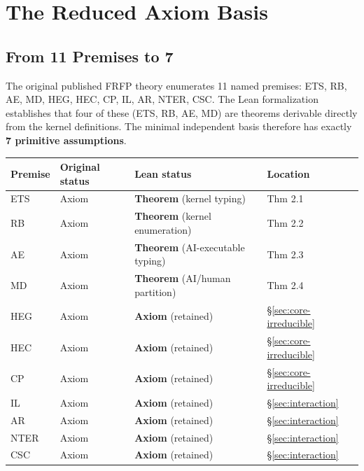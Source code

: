 \section{The Reduced Axiom Basis}
\label{ch:basis}

\subsection{From 11 Premises to 7}

The original published FRFP theory enumerates 11 named premises: ETS, RB, AE, MD,
HEG, HEC, CP, IL, AR, NTER, CSC. The Lean formalization establishes that four of
these (ETS, RB, AE, MD) are theorems derivable directly from the kernel
definitions. The minimal independent basis therefore has exactly \textbf{7
primitive assumptions}.

\begin{center}
\begin{tabular}{llll}
\toprule
Premise & Original status & Lean status & Location \\
\midrule
ETS  & Axiom & \textbf{Theorem} (kernel typing) & Thm 2.1 \\
RB   & Axiom & \textbf{Theorem} (kernel enumeration) & Thm 2.2 \\
AE   & Axiom & \textbf{Theorem} (AI-executable typing) & Thm 2.3 \\
MD   & Axiom & \textbf{Theorem} (AI/human partition) & Thm 2.4 \\
HEG  & Axiom & \textbf{Axiom} (retained) & \S\ref{sec:core-irreducible} \\
HEC  & Axiom & \textbf{Axiom} (retained) & \S\ref{sec:core-irreducible} \\
CP   & Axiom & \textbf{Axiom} (retained) & \S\ref{sec:core-irreducible} \\
IL   & Axiom & \textbf{Axiom} (retained) & \S\ref{sec:interaction} \\
AR   & Axiom & \textbf{Axiom} (retained) & \S\ref{sec:interaction} \\
NTER & Axiom & \textbf{Axiom} (retained) & \S\ref{sec:interaction} \\
CSC  & Axiom & \textbf{Axiom} (retained) & \S\ref{sec:interaction} \\
\bottomrule
\end{tabular}
\end{center}

